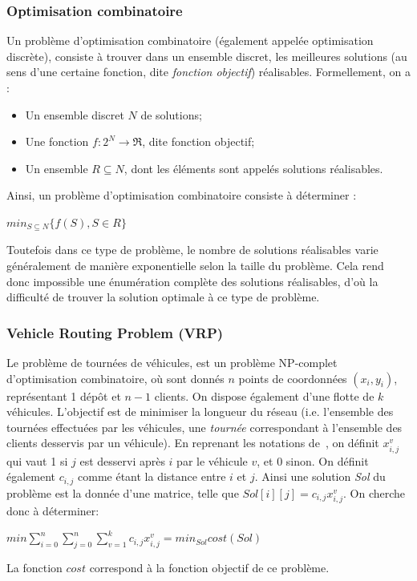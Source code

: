\documentclass[a4paper,11pt]{article}%
\begin{document}
\subsubsection{Optimisation combinatoire}
Un problème d'optimisation combinatoire (également appelée optimisation discrète), consiste à trouver dans un ensemble discret, les meilleures solutions (au sens d'une certaine fonction, dite \emph{fonction objectif}) réalisables. 
Formellement, on a :

\begin{itemize}
\item Un ensemble discret $N$ de solutions;
\item Une fonction $f : 2^N \rightarrow \Re$, dite fonction objectif;
\item Un ensemble $R \subseteq N$, dont les éléments sont appelés solutions réalisables.
\end{itemize}

Ainsi, un problème d'optimisation combinatoire consiste à déterminer :

\begin{center}
$ min_{S \subseteq N} \{ f(S), S \in R \} $
\end{center}

Toutefois dans ce type de problème, le nombre de solutions réalisables varie généralement de manière exponentielle selon la taille du problème. Cela rend donc impossible une énumération complète des solutions réalisables, d'où la difficulté de trouver la solution optimale à ce type de problème.

\subsubsection{Vehicle Routing Problem (VRP)}

Le problème de tournées de véhicules, est un problème NP-complet d'optimisation combinatoire, où sont donnés $n$ points de coordonnées $(x_i,y_i)$, représentant 1 dépôt et $n-1$ clients. On dispose également d'une flotte de $k$ véhicules. 
L'objectif est de minimiser la longueur du réseau (i.e. l'ensemble des tournées effectuées par les véhicules, une \emph{tournée} correspondant à l'ensemble des clients desservis par un véhicule). 
En reprenant les notations de~\cite{cvrp_pres}, on définit $x_{i,j}^v$ qui vaut 1 si $j$ est desservi après $i$ par le véhicule $v$, et 0 sinon. 
On définit également $c_{i,j}$ comme étant la distance entre $i$ et $j$.
Ainsi une solution \emph{Sol} du problème est la donnée d'une matrice, telle que $Sol[i][j] = c_{i,j} x_{i,j}^v$.
On cherche donc à déterminer:
\begin{center}
$ min \sum_{i = 0}^{n} \sum_{j = 0}^{n} \sum_{v = 1}^{k} c_{i,j} x_{i,j}^v = min_{Sol}cost(Sol)$
\end{center}
La fonction $cost$ correspond à la fonction objectif de ce problème.
\end{document}
